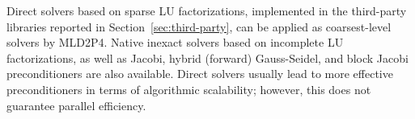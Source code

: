 Direct solvers based on sparse LU factorizations, implemented in the
third-party libraries reported in Section~\ref{sec:third-party}, can be applied
as coarsest-level solvers by MLD2P4. Native inexact solvers based on
incomplete LU factorizations, as well as Jacobi, hybrid (forward) Gauss-Seidel,
and block Jacobi preconditioners are also available. Direct solvers usually
lead to more effective preconditioners in terms of algorithmic scalability;
however, this does not guarantee parallel efficiency.

